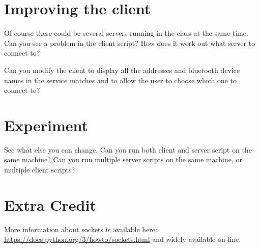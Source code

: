 \documentclass[12pt,oneside]{cttutorial}
\begin{document}
\section{Improving the client}

Of course there could be several servers running in the class at the same time. Can you see a problem in the client script? How does it work out what server to connect to?

Can you modify the client to display all the addresses and bluetooth device names in the service matches and to allow the user to choose which one to connect to?


\section{Experiment}

See what else you can change. Can you run both client and server script on the same machine? Can you run multiple server scripts on the same machine, or multiple client scripts?

\section{Extra Credit}

More information about sockets is available here: \url{https://docs.python.org/3/howto/sockets.html} and widely available on-line.
\end{document}
